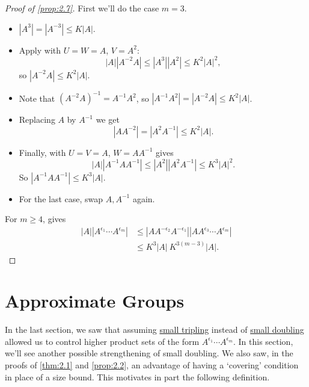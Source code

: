 \documentclass{article}
\numberwithin{equation}{section}
\begin{document}
\begin{proof}[Proof of \cref{prop:2.7}]
  First we'll do the case $m=3$.
  \begin{itemize}
    \item $|A^3| = |A^{-3}| \leq K|A|$.
    \item Apply  with $U=W=A$, $V = A^2$:
      \begin{equation*}
        |A| |A^{-2} A| \leq |A^3| |A^2| \leq K^2 |A|^2,
      \end{equation*}
      so $|A^{-2} A| \leq K^2 |A|$.
    \item Note that $(A^{-2} A)^{-1} = A^{-1} A^2$, so $|A^{-1} A^2| = |A^{-2} A| \leq K^2 |A|$.
    \item Replacing $A$ by $A^{-1}$ we get
      \begin{equation*}
        |A A^{-2}| = |A^2 A^{-1}| \leq K^2 |A|.
      \end{equation*}
    \item Finally,  with $U=V=A$, $W = A A^{-1}$ gives
      \begin{equation*}
        |A| |A^{-1} A A^{-1}| \leq |A^2| |A^2 A^{-1}| \leq K^3 |A|^2.
      \end{equation*}
      So $|A^{-1} A A^{-1}| \leq K^3 |A|$.
    \item For the last case, swap $A,A^{-1}$ again.
  \end{itemize}
  For $m \geq 4$,  gives
  \begin{align*}
    |A| |A^{\epsilon_1} \dotsm A^{\epsilon_m}| &\leq |A A^{-\epsilon_2} A^{-\epsilon_1}| |A A^{\epsilon_3} \dotsm  A^{\epsilon_m}| \\
                                              & \leq K^3 |A|\ K^{3(m-3)} |A|.
  \end{align*}
\end{proof}

\clearpage
\section{Approximate Groups}
\newlec
In the last section, we saw that assuming \hyperlink{def:tripling}{small tripling} instead of \hyperlink{def:doubling}{small doubling} allowed us to control higher product sets of the form $A^{\epsilon_1} \dotsm A^{\epsilon_m}$.
In this section, we'll see another possible strengthening of small doubling. We also saw, in the proofs of \cref{thm:2.1} and \cref{prop:2.2}, an advantage of having a `covering' condition in place of a size bound. This motivates in part the following definition.
\end{document}

